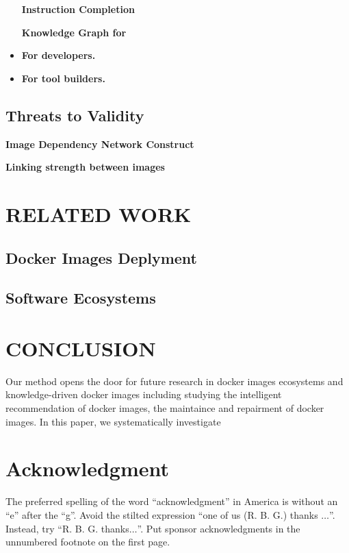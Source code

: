 \documentclass[sigconf]{acmart}
\begin{document}
\begin{itemize}
\noindent\textbf{Instruction Completion}


\noindent\textbf{Knowledge Graph for}


\item \textbf{For developers.}
\item \textbf{For tool builders.}
\end{itemize}

\subsection{Threats to Validity}
\noindent\textbf{Image Dependency Network Construct}

\noindent\textbf{Linking strength between images}







\section{RELATED WORK}

\subsection{Docker Images Deplyment}

\subsection{Software Ecosystems}






\section{CONCLUSION}
Our method opens the door for future research in docker images ecosystems and knowledge-driven docker images including studying the intelligent recommendation of docker images, the maintaince and repairment of docker images. In this paper, we systematically investigate 






\section*{Acknowledgment}

The preferred spelling of the word ``acknowledgment'' in America is without 
an ``e'' after the ``g''. Avoid the stilted expression ``one of us (R. B. 
G.) thanks $\ldots$''. Instead, try ``R. B. G. thanks$\ldots$''. Put sponsor 
acknowledgments in the unnumbered footnote on the first page.
\end{document}
